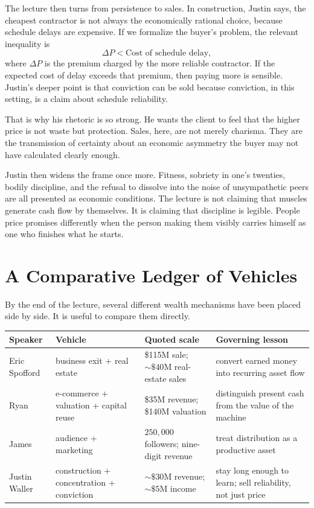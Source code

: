 The lecture then turns from persistence to sales. In construction, Justin says, the cheapest contractor is not always the economically rational choice, because schedule delays are expensive. If we formalize the buyer's problem, the relevant inequality is
\begin{equation}
\Delta P < \text{Cost of schedule delay},
\end{equation}
where \(\Delta P\) is the premium charged by the more reliable contractor. If the expected cost of delay exceeds that premium, then paying more is sensible. Justin's deeper point is that conviction can be sold because conviction, in this setting, is a claim about schedule reliability.

That is why his rhetoric is so strong. He wants the client to feel that the higher price is not waste but protection. Sales, here, are not merely charisma. They are the transmission of certainty about an economic asymmetry the buyer may not have calculated clearly enough.

Justin then widens the frame once more. Fitness, sobriety in one's twenties, bodily discipline, and the refusal to dissolve into the noise of unsympathetic peers are all presented as economic conditions. The lecture is not claiming that muscles generate cash flow by themselves. It is claiming that discipline is legible. People price promises differently when the person making them visibly carries himself as one who finishes what he starts.

\section{A Comparative Ledger of Vehicles}

By the end of the lecture, several different wealth mechanisms have been placed side by side. It is useful to compare them directly.

\begin{table}
\centering
\begin{tabular}{|l|l|l|l|}
\hline
Speaker & Vehicle & Quoted scale & Governing lesson \\
\hline
Eric Spofford & business exit + real estate & \$115M sale; $\sim\$40$M real-estate sales & convert earned money into recurring asset flow \\
\hline
Ryan & e-commerce + valuation + capital reuse & \$35M revenue; \$140M valuation & distinguish present cash from the value of the machine \\
\hline
James & audience + marketing & $250{,}000$ followers; nine-digit revenue & treat distribution as a productive asset \\
\hline
Justin Waller & construction + concentration + conviction & $\sim\$30$M revenue; $\sim\$5$M income & stay long enough to learn; sell reliability, not just price \\
\hline
\end{tabular}
\end{table}

